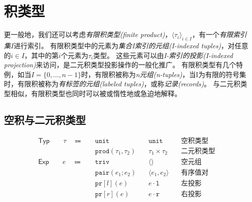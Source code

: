 \chapter{积类型}


更一般地，我们还可以考虑\textit{有限积类型(finite product)}，$\langle\tau_i \rangle_{i\in I}$，有一个\textit{有限索引集}$I$进行索引。
有限积类型中的元素为\textit{集合I索引的元组(I-indexed tuples)}，对任意的$i\in I$，其中的第$i$个元素为$\tau_i$类型。
这些元素可以由\textit{I-索引的投影(I-indexed projection)}来访问，是二元积类型投影操作的一般化推广。
有限积类型有几个特例，如当$I = \{ 0, \dots, n-1\}$时，有限积被称为\textit{n元组(n-tuples)}，当I为有限的符号集时，有限积被称为\textit{有标签的元组(labeled tuples)}，或称\textit{记录(records)}。
与二元积类型相似，有限积类型也同时可以被或惰性地或急迫地解释。


\section{空积与二元积类型}
\label{null-product-and-binary-product}
\begin{equation*}
\begin{aligned}
\mathsf{Typ} \qquad \tau \quad \Coloneqq \quad &\mathtt{unit}\quad &\mathtt{unit} \quad &\mbox{空积类型}
\\
&\mathtt{prod}(\tau_1, \tau_2) \quad &\tau_1 \times \tau_2 \quad &\mbox{二元积类型}
\\
\mathsf{Exp} \qquad e \quad \Coloneqq \quad &\mathtt{triv} \quad &\langle \rangle \quad &\mbox{空元组}
\\
&\mathtt{pair}(e_1; e_2) \quad &\langle e_1,e_2 \rangle \quad &\mbox{有序值对}
\\
&\mathtt{pr}[l](e) \quad &e \cdot \mathtt{l} \quad &\mbox{左投影}
\\
&\mathtt{pr}[r](e) \quad &e \cdot \mathtt{r} \quad &\mbox{右投影}
\end{aligned}
\end{equation*}

